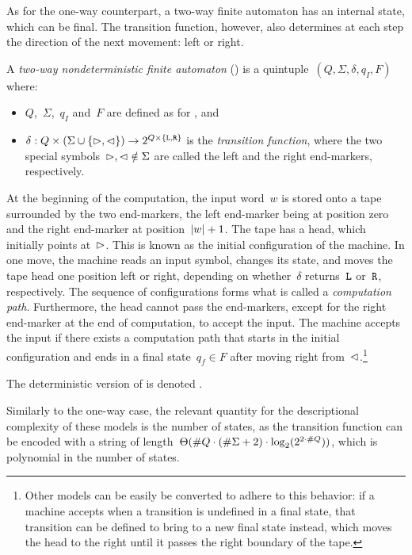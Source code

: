 As for the one-way counterpart, a two-way finite automaton has an internal state, which can be final.
The transition function, however, also determines at each step the direction of the next movement: left or right.

\begin{defn}
	A \emph{two-way nondeterministic finite automaton} (\TNFA) is a quintuple~$(Q,\Sigma,\delta,q_I,F)$ where:
	\begin{itemize}
		\item $Q$,~$\Sigma$,~$q_I$ and~$F$ are defined as for \ONFAs, and
		\item $\delta:Q\times(\Sigma\cup\{\rhd,\lhd\})\to2^{Q\times\{\mathtt L,\mathtt R\}}$ is the \emph{transition function}, where the two special symbols~$\rhd,\lhd\notin\Sigma$ are called the left and the right end-markers, respectively.
	\end{itemize}
	At the beginning of the computation, the input word~$w$ is stored onto a tape surrounded by the two end-markers, the left end-marker being at position zero and the right end-marker at position~$\lvert w \rvert+1$.
	The tape has a head, which initially points at~$\rhd$.
	This is known as the initial configuration of the machine.
	In one move, the machine reads an input symbol, changes its state, and moves the tape head one position left or right, depending on whether~$\delta$ returns~$\mathtt L$ or~$\mathtt R$, respectively.
	The sequence of configurations forms what is called a \emph{computation path}.
	Furthermore, the head cannot pass the end-markers, except for the right end-marker at the end of computation, to accept the input.
	The machine accepts the input if there exists a computation path that starts in the initial configuration and ends in a final state~$q_f\in F$ after moving right from~$\lhd$.\footnote{%
	Other models can be easily be converted to adhere to this behavior: if a machine accepts when a transition is undefined in a final state, that transition can be defined to bring to a new final state instead, which moves the head to the right until it passes the right boundary of the tape.}

	\noindent The deterministic version of \TNFAs is denoted \TDFAs.
\end{defn}

Similarly to the one-way case, the relevant quantity for the descriptional complexity of these models is the number of states, as the transition function can be encoded with a string of length~$\Theta(\# Q\cdot(\# \Sigma+2)\cdot\log_2(2^{2\cdot\# Q}))$, which is polynomial in the number of states.

